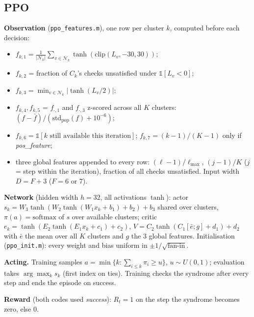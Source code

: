 \documentclass[10pt,a4paper]{article}
\begin{document}
\subsection{PPO}
\textbf{Observation} (\texttt{ppo\_features.m}), one row per cluster $k$, computed before each decision:
\begin{itemize}
\item $f_{k,1}=\frac{1}{|\mathcal N_k|}\sum_{v\in\mathcal N_k}\tanh(\mathrm{clip}(L_v,-30,30))$;
\item $f_{k,2}$ = fraction of $C_k$'s checks unsatisfied under $\mathbb 1[L_v<0]$;
\item $f_{k,3}=\min_{v\in\mathcal N_k}|\tanh(L_v/2)|$;
\item $f_{k,4},f_{k,5}$ = $f_{\cdot,1}$ and $f_{\cdot,3}$ z-scored across all $K$ clusters: $(f-\bar f)/(\mathrm{std}_{\text{pop}}(f)+10^{-6})$;
\item $f_{k,6}=\mathbb 1[k\text{ still available this iteration}]$; $f_{k,7}=(k-1)/(K-1)$ only if \emph{pos\_feature};
\item three global features appended to every row: $(\ell-1)/\ell_{\max}$, $(j-1)/K$ ($j$ = step within the iteration), fraction of all checks unsatisfied. Input width $D=F+3$ ($F=6$ or 7).
\end{itemize}

\textbf{Network} (hidden width $h=32$, all activations $\tanh$): actor $s_k=W_3\tanh(W_2\tanh(W_1x_k+b_1)+b_2)+b_3$ shared over clusters,
$\pi(a)=\mathrm{softmax}$ of $s$ over available clusters; critic $e_k=\tanh(E_2\tanh(E_1x_k+c_1)+c_2)$,
$V=C_2\tanh(C_1[\bar e;g]+d_1)+d_2$ with $\bar e$ the mean over all $K$ clusters and $g$ the 3 global features.
Initialisation (\texttt{ppo\_init.m}): every weight and bias uniform in $\pm1/\sqrt{\text{fan-in}}$.

\textbf{Acting.} Training samples $a=\min\{k:\sum_{i\le k}\pi_i\ge u\}$, $u\sim U(0,1)$; evaluation takes $\arg\max_k s_k$ (first index on ties). Training checks the syndrome after every step and ends the episode on success.

\textbf{Reward} (both codes used \emph{success}): $R_t=1$ on the step the syndrome becomes zero, else 0.
\end{document}
